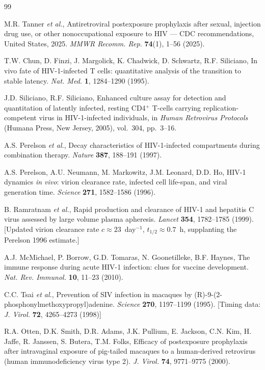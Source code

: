 \documentclass[11pt]{article}
\theoremstyle{definition}
\theoremstyle{remark}
\begin{document}
\begin{thebibliography}{99}

M.R. Tanner \textit{et al.}, Antiretroviral postexposure prophylaxis after sexual, injection drug use, or other nonoccupational exposure to HIV --- CDC recommendations, United States, 2025. \textit{MMWR Recomm. Rep.} \textbf{74}(1), 1--56 (2025).

T.W. Chun, D. Finzi, J. Margolick, K. Chadwick, D. Schwartz, R.F. Siliciano, In vivo fate of HIV-1-infected T cells: quantitative analysis of the transition to stable latency. \textit{Nat. Med.} \textbf{1}, 1284--1290 (1995).

J.D. Siliciano, R.F. Siliciano, Enhanced culture assay for detection and quantitation of latently infected, resting CD4$^{+}$ T-cells carrying replication-competent virus in HIV-1-infected individuals, in \textit{Human Retrovirus Protocols} (Humana Press, New Jersey, 2005), vol.~304, pp.~3--16.

A.S. Perelson \textit{et al.}, Decay characteristics of HIV-1-infected compartments during combination therapy. \textit{Nature} \textbf{387}, 188--191 (1997).

A.S. Perelson, A.U. Neumann, M. Markowitz, J.M. Leonard, D.D. Ho, HIV-1 dynamics \textit{in vivo}: virion clearance rate, infected cell life-span, and viral generation time. \textit{Science} \textbf{271}, 1582--1586 (1996).

B. Ramratnam \textit{et al.}, Rapid production and clearance of HIV-1 and hepatitis C virus assessed by large volume plasma apheresis. \textit{Lancet} \textbf{354}, 1782--1785 (1999). [Updated virion clearance rate $c \approx 23$~day$^{-1}$, $t_{1/2} \approx 0.7$~h, supplanting the Perelson 1996 estimate.]

A.J. McMichael, P. Borrow, G.D. Tomaras, N. Goonetilleke, B.F. Haynes, The immune response during acute HIV-1 infection: clues for vaccine development. \textit{Nat. Rev. Immunol.} \textbf{10}, 11--23 (2010).

C.C. Tsai \textit{et al.}, Prevention of SIV infection in macaques by (R)-9-(2-phosphonylmethoxypropyl)adenine. \textit{Science} \textbf{270}, 1197--1199 (1995). [Timing data: \textit{J. Virol.} \textbf{72}, 4265--4273 (1998)]

R.A. Otten, D.K. Smith, D.R. Adams, J.K. Pullium, E. Jackson, C.N. Kim, H. Jaffe, R. Janssen, S. Butera, T.M. Folks, Efficacy of postexposure prophylaxis after intravaginal exposure of pig-tailed macaques to a human-derived retrovirus (human immunodeficiency virus type 2). \textit{J. Virol.} \textbf{74}, 9771--9775 (2000).


\end{thebibliography}
\end{document}

